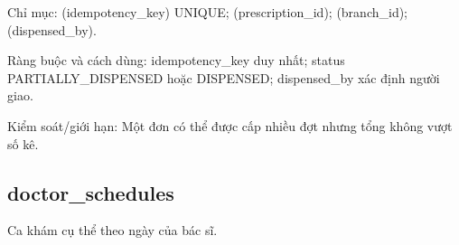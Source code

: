 Chỉ mục:\allowbreak{} (idempotency\_\allowbreak{}key) UNIQUE; (prescription\_\allowbreak{}id); (branch\_\allowbreak{}id); (dispensed\_\allowbreak{}by).\allowbreak{}

Ràng buộc và cách dùng:\allowbreak{} idempotency\_\allowbreak{}key duy nhất; status PARTIALLY\_\allowbreak{}DISPENSED hoặc DISPENSED; dispensed\_\allowbreak{}by xác định người giao.\allowbreak{}

Kiểm soát/\allowbreak{}giới hạn:\allowbreak{} Một đơn có thể được cấp nhiều đợt nhưng tổng không vượt số kê.\allowbreak{}

\clearpage

\subsection{doctor\_\allowbreak{}schedules}
Ca khám cụ thể theo ngày của bác sĩ.\allowbreak{}


